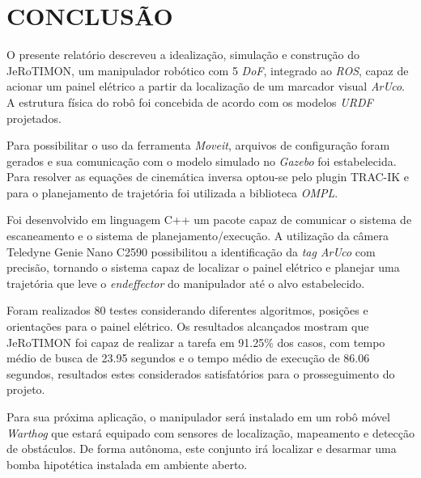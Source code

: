 \chapter{CONCLUSÃO}
\label{chap:conclu}

O presente relatório descreveu a idealização, simulação e construção do JeRoTIMON, um manipulador robótico com 5 \textit{\acs{DoF}}, integrado ao \textit{\acs{ROS}}, capaz de acionar um painel elétrico a partir da localização de um marcador visual \textit{ArUco}. A estrutura física do robô foi concebida de acordo com os modelos \textit{\acs{URDF}} projetados. 

Para possibilitar o uso da ferramenta \textit{Moveit}, arquivos de configuração foram gerados e sua comunicação com o modelo simulado no \textit{Gazebo} foi estabelecida. Para resolver as equações de cinemática inversa optou-se pelo plugin TRAC-IK e para o planejamento de trajetória foi utilizada a biblioteca \textit{\acs{OMPL}}.

Foi desenvolvido em linguagem C++ um pacote capaz de comunicar o sistema de escaneamento e o sistema de planejamento/execução. A utilização da câmera Teledyne Genie Nano C2590 possibilitou a identificação da \textit{tag ArUco} com precisão, tornando o sistema capaz de localizar o painel elétrico e planejar uma trajetória que leve o \textit{endeffector} do manipulador até o alvo estabelecido.

Foram realizados 80 testes considerando diferentes algoritmos, posições e orientações para o painel elétrico. Os resultados alcançados mostram que JeRoTIMON foi capaz de realizar a tarefa em 91.25\% dos casos, com tempo médio de busca de 23.95 segundos e o tempo médio de execução de 86.06 segundos, resultados estes considerados satisfatórios para o prosseguimento do projeto.

Para sua próxima aplicação, o manipulador será instalado em um robô móvel \textit{Warthog} que estará equipado com sensores de localização, mapeamento e detecção de obstáculos. De forma autônoma, este conjunto irá localizar e desarmar uma bomba hipotética instalada em ambiente aberto.